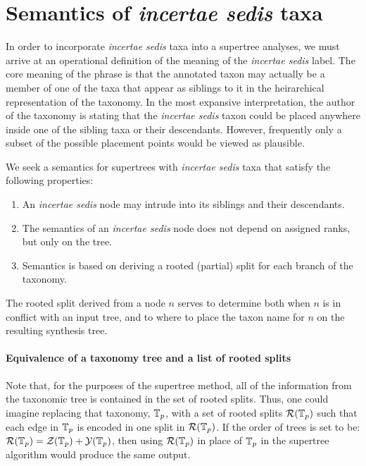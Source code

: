 \documentclass[english]{article}
\begin{document}
\section{\label{sec:Semantics-of-incertae}Semantics of \emph{incertae
sedis} taxa}

In order to incorporate \emph{incertae sedis }taxa into a supertree
analyses, we must arrive at an operational definition of the meaning
of the \emph{incertae sedis} label.
The core meaning of the phrase is
that the annotated taxon may actually be a member of one of the taxa
that appear as siblings to it in the heirarchical representation of
the taxonomy.
In the most expansive interpretation, the author of the
taxonomy is stating that the \emph{incertae sedis} taxon could be
placed anywhere inside one of the sibling taxa or their descendants.
However, frequently only a subset of the possible placement points
would be viewed as plausible.

We seek a semantics for supertrees with \emph{incertae sedis }taxa
that satisfy the following properties:
\begin{enumerate}
    \item An \emph{incertae sedis} node may intrude into its siblings and their
descendants.
    \item The semantics of an \emph{incertae sedis} node does not depend on assigned ranks, but only on the tree.
    \item Semantics is based on deriving a rooted (partial) split for each branch of the taxonomy.
\end{enumerate}

The rooted split derived from a node $n$ serves to determine both when $n$ is in conflict
with an input tree, and to where to place the taxon name for $n$ on the resulting synthesis tree.

\paragraph{Equivalence of a taxonomy tree and a list of rooted splits}

Note that, for the purposes of the supertree method, all of the information from
the taxonomic tree is contained in the set of rooted splits. Thus, one could
imagine replacing that taxonomy, $\mbox{\ensuremath{\mathbb{T}}}_{p}$, with a set of rooted splits $\mathcal{R}(\mbox{\ensuremath{\mathbb{T}}}_{p})$ such that
each edge in $\mbox{\ensuremath{\mathbb{T}}}_{p}$ is encoded in one split in $\mathcal{R}(\mbox{\ensuremath{\mathbb{T}}}_{p})$. If the order of trees is set
to be: $\mathcal{R}(\mbox{\ensuremath{\mathbb{T}}}_{p})=\mathcal{Z}(\mbox{\ensuremath{\mathbb{T}}}_{p}) + 
\mathcal{Y}(\mbox{\ensuremath{\mathbb{T}}}_{p})$, then using $\mathcal{R}(\mbox{\ensuremath{\mathbb{T}}}_{p})$ in place of $\mbox{\ensuremath{\mathbb{T}}}_{p}$ in the supertree
algorithm would produce the same output.
\end{document}
